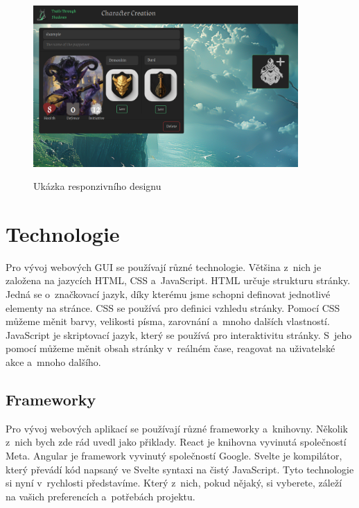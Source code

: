 \begin{figure}[H]
\begin{minipage}{0.3\textwidth}
    \label{fig:example5}
  \end{minipage}
  \begin{minipage}{0.7\textwidth}
    \centering
    \includegraphics[width=0.9\textwidth]{resources/figures/example6.png}
    \label{fig:example6}
  \end{minipage}
  \caption{Ukázka responzivního designu}
\end{figure}

\section{Technologie}
\label{sec:technologies}

Pro vývoj webových GUI se používají různé technologie. Většina z~nich je založena na jazycích HTML, CSS a~JavaScript. HTML určuje strukturu stránky. Jedná se o~značkovací jazyk, díky kterému jsme schopni definovat jednotlivé elementy na stránce. CSS se používá pro definici vzhledu stránky. Pomocí CSS můžeme měnit barvy, velikosti písma, zarovnání a~mnoho dalších vlastností. JavaScript je skriptovací jazyk, který se používá pro interaktivitu stránky. S~jeho pomocí můžeme měnit obsah stránky v~reálném čase, reagovat na uživatelské akce a~mnoho dalšího.

\subsection{Frameworky}
\label{subsec:frameworks}

Pro vývoj webových aplikací se používají různé frameworky a~knihovny. Několik z~nich bych zde rád uvedl jako přiklady. React je knihovna vyvinutá společností Meta. Angular je framework vyvinutý společností Google. Svelte je kompilátor, který převádí kód napsaný ve Svelte syntaxi na čistý JavaScript. Tyto technologie si nyní v~rychlosti představíme. Který z~nich, pokud nějaký, si vyberete, záleží na vašich preferencích a~potřebách projektu.

